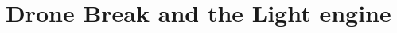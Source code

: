\documentclass[11pt]{article}
\date{\today}
\title{}
\begin{document}
\tableofcontents

\section{Drone Break and the Light engine}
\label{sec:orgfcdf754}
\end{document}
